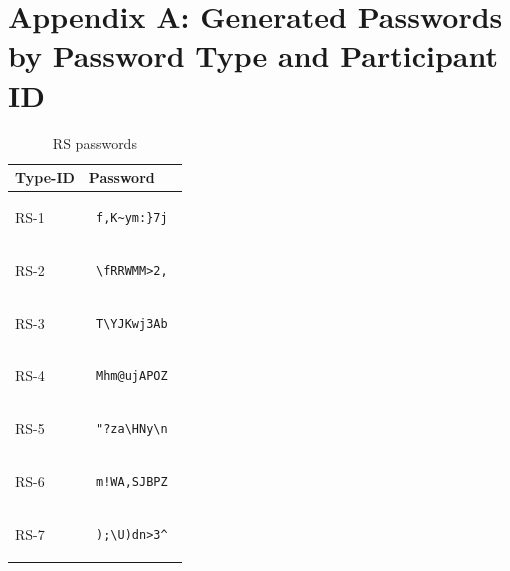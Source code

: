 \documentclass{article}
\begin{document}
\section*{Appendix A: Generated Passwords by Password Type and Participant ID}
\centering
\begin{table}[h]
\begin{tabular}{|m{1.4cm}|m{8cm}|}
\hline
Type-ID & Password \\
\hline
RS-1 & \begin{verbatim} f,K~ym:}7j \end{verbatim} \\
\hline
RS-2 & \begin{verbatim} \fRRWMM>2, \end{verbatim} \\
\hline
RS-3 & \begin{verbatim} T\YJKwj3Ab \end{verbatim} \\
\hline
RS-4 & \begin{verbatim} Mhm@ujAPOZ \end{verbatim} \\
\hline
RS-5 & \begin{verbatim} "?za\HNy\n \end{verbatim} \\
\hline
RS-6 & \begin{verbatim} m!WA,SJBPZ \end{verbatim} \\
\hline
RS-7 & \begin{verbatim} );\U)dn>3^ \end{verbatim} \\
\hline
\end{tabular}
\caption{RS passwords}
\end{table}
\end{document}
